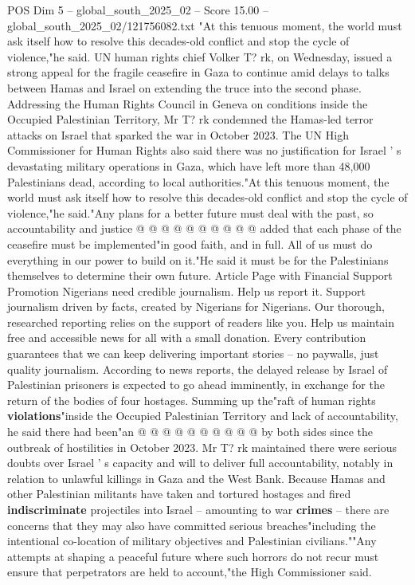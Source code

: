\begin{textsample}{POS Dim 5 – global\_south\_2025\_02 – Score 15.00 – global\_south\_2025\_02/121756082.txt}  \label{ex:f5_pos_216}
"At this tenuous moment, the world must ask itself how to resolve this decades-old conflict and stop the cycle of violence,"he said.
UN human rights chief Volker T? rk, on Wednesday, issued a strong appeal for the fragile ceasefire in Gaza to continue amid delays to talks between Hamas and Israel on extending the truce into the second phase.
Addressing the Human Rights Council in Geneva on conditions inside the Occupied Palestinian Territory, Mr T? rk condemned the Hamas-led terror attacks on Israel that sparked the war in October 2023.
The UN High Commissioner for Human Rights also said there was no justification for Israel ' s devastating military operations in Gaza, which have left more than 48,000 Palestinians dead, according to local authorities."At this tenuous moment, the world must ask itself how to resolve this decades-old conflict and stop the cycle of violence,"he said."Any plans for a better future must deal with the past, so accountability and justice @ @ @ @ @ @ @ @ @ @ added that each phase of the ceasefire must be implemented"in good faith, and in full.
All of us must do everything in our power to build on it."He said it must be for the Palestinians themselves to determine their own future.
Article Page with Financial Support Promotion Nigerians need credible journalism.
Help us report it.
Support journalism driven by facts, created by Nigerians for Nigerians.
Our thorough, researched reporting relies on the support of readers like you.
Help us maintain free and accessible news for all with a small donation.
Every contribution guarantees that we can keep delivering important stories -- no paywalls, just quality journalism.
According to news reports, the delayed release by Israel of Palestinian prisoners is expected to go ahead imminently, in exchange for the return of the bodies of four hostages.
Summing up the"raft of human rights \textbf{violations}"inside the Occupied Palestinian Territory and lack of accountability, he said there had been"an @ @ @ @ @ @ @ @ @ @ by both sides since the outbreak of hostilities in October 2023.
Mr T? rk maintained there were serious doubts over Israel ' s capacity and will to deliver full accountability, notably in relation to unlawful killings in Gaza and the West Bank.
Because Hamas and other Palestinian militants have taken and tortured hostages and fired \textbf{indiscriminate} projectiles into Israel -- amounting to war \textbf{crimes} -- there are concerns that they may also have committed serious breaches"including the intentional co-location of military objectives and Palestinian civilians.""Any attempts at shaping a peaceful future where such horrors do not recur must ensure that perpetrators are held to account,"the High Commissioner said.

\end{textsample}
